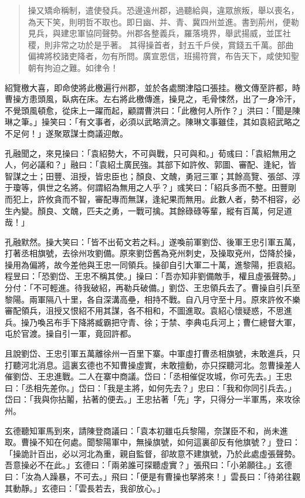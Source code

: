 \begin{quote}
操又矯命稱制，遣使發兵。恐邊遠州郡，過聽給與，違眾旅叛，舉以喪名，為天下笑，則明哲不取也。即日幽、并、青、冀四州並進。書到荊州，便勒見兵，與建忠軍協同聲勢。州郡各整義兵，羅落境界，舉武揚威，並匡社稷，則非常之功於是乎著。
其得操首者，封五千戶侯，賞錢五千萬。部曲偏裨將校諸吏降者，勿有所問。廣宣恩信，班揚符賞，布告天下，咸使知聖朝有拘迫之難。如律令！
\end{quote}

紹覽檄大喜，即命使將此檄遍行州郡，並於各處關津隘口張挂。檄文傳至許都，時曹操方患頭風，臥病在床。左右將此檄傳進，操見之，毛骨悚然，出了一身冷汗，不覺頭風頓愈，從床上一躍而起，顧謂曹洪曰：「此檄何人所作？」洪曰：「聞是陳琳之筆。」操笑曰：「有文事者，必須以武略濟之。陳琳文事雖佳，其如袁紹武略之不足何！」遂聚眾謀士商議迎敵。

孔融聞之，來見操曰：「袁紹勢大，不可與戰，只可與和。」荀彧曰：「袁紹無用之人，何必議和？」融曰：「袁紹土廣民強。其部下如許攸、郭圖、審配、逢紀，皆智謀之士；田豐、沮授，皆忠臣也；顏良、文醜，勇冠三軍；其餘高覽、張郃、淳于瓊等，俱世之名將。何謂紹為無用之人乎？」彧笑曰：「紹兵多而不整。田豐剛而犯上，許攸貪而不智，審配專而無謀，逢紀果而無用。此數人者，勢不相容，必生內變。顏良、文醜，匹夫之勇，一戰可擒。其餘碌碌等輩，縱有百萬，何足道哉！」

孔融默然。操大笑曰：「皆不出荀文若之料。」遂喚前軍劉岱、後軍王忠引軍五萬，打著丞相旗號，去徐州攻劉備。原來劉岱舊為兗州刺史，及操取兗州，岱降於操，操用為偏將，故今差他與王忠一同領兵。操卻自引大軍二十萬，進黎陽，拒袁紹。程昱曰：「恐劉岱、王忠不稱其使。」操曰：「吾亦知非劉備敵手，權且虛張聲勢。」分付：「不可輕進。待我破紹，再勒兵破備。」劉岱、王忠領兵去了。曹操自引兵至黎陽。兩軍隔八十里，各自深溝高壘，相持不戰。自八月守至十月。原來許攸不樂審配領兵，沮授又恨紹不用其謀，各不相和，不圖進取。袁紹心懷疑惑，不思進兵。操乃喚呂布手下降將臧霸把守青、徐；于禁、李典屯兵河上；曹仁總督大軍，屯於官渡。操自引一軍，竟回許都。

且說劉岱、王忠引軍五萬離徐州一百里下寨。中軍虛打曹丞相旗號，未敢進兵，只打聽河北消息。這裏玄德也不知曹操虛實，未敢擅動，亦只探聽河北。忽曹操差人催劉岱、王忠進戰。二人在寨中商議。岱曰：「丞相催促攻城，你可先去。」王忠曰：「丞相先差你。」岱曰：「我是主將，如何先去？」忠曰：「我和你同引兵去。」岱曰：「我與你拈鬮，拈著的便去。」王忠拈著「先」字，只得分一半軍馬，來攻徐州。

玄德聽知軍馬到來，請陳登商議曰：「袁本初雖屯兵黎陽，奈謀臣不和，尚未進取。曹操不知在何處。聞黎陽軍中，無操旗號，如何這裏卻反有他旗號？」登曰：「操詭計百出，必以河北為重，親自監督，卻故意不建旗號，乃於此處虛張聲勢。吾意操必不在此。」玄德曰：「兩弟誰可探聽虛實？」張飛曰：「小弟願往。」玄德曰：「汝為人躁暴，不可去。」飛曰：「便是有曹操也拏將來！」雲長曰：「待弟往觀其動靜。」玄德曰：「雲長若去，我卻放心。」

